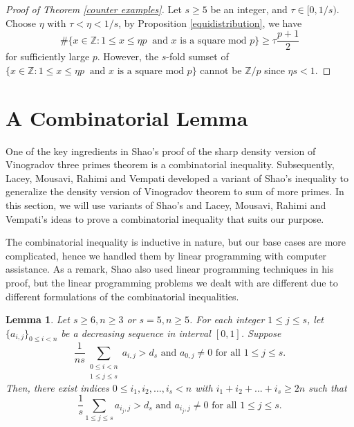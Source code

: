 \documentclass[11pt]{amsart}
\theoremstyle{plain} %
\newtheorem{lem}[thm]{Lemma}
\theoremstyle{remark}
\numberwithin{equation}{section}
\newcommand{\Z}{\mathbb{Z}}
\begin{document}
\begin{proof}[Proof of Theorem \ref{counter examples}]
    Let $s\geq 5$ be an integer, and $\tau\in [0,1/s)$. Choose $\eta$ with $\tau<\eta<1/s$, by Proposition \ref{equidistribution}, we have
    \begin{equation*}
        \#\{x\in\Z:1\leq x\leq \eta p\;\;\text{and $x$ is a square mod $p$}\}\geq\tau\frac{p+1}{2}
    \end{equation*}
    for sufficiently large $p$. However, the $s$-fold sumset of $\{x\in\Z:1\leq x\leq \eta p\;\;\text{and $x$ is a square mod $p$}\}$ cannot be $\Z/p$ since $\eta s<1$.
\end{proof}

\section{A Combinatorial Lemma}\label{sec: combinatorial lemma}

One of the key ingredients in Shao's \cite{Shao} proof of the sharp density version of Vinogradov three primes theorem is a combinatorial inequality. Subsequently, Lacey, Mousavi, Rahimi and Vempati \cite{lacey2024densitytheoremhigherorder} developed a variant of Shao's inequality to generalize the density version of Vinogradov theorem to sum of more primes. In this section, we will use variants of Shao's and Lacey, Mousavi, Rahimi and Vempati's ideas to prove a combinatorial inequality that suits our purpose. 

The combinatorial inequality is inductive in nature, but our base cases are more complicated, hence we handled them by linear programming with computer assistance. As a remark, Shao also used linear programming techniques in his proof, but the linear programming problems we dealt with are different due to different formulations of the combinatorial inequalities.

\begin{lem}\label{combinatorial lemma}
    Let $s\geq 6, n\geq 3$ or $s=5, n\geq 5$. For each integer $1\leq j\leq s$, let $\{a_{i,j}\}_{0\leq i<n}$ be a decreasing sequence in interval $[0,1]$. Suppose 
    \begin{equation*}
        \text{$\frac{1}{ns}\sum_{\substack{0\leq i<n\\1\leq j\leq s}}a_{i,j}>d_s$ and $a_{0,j}\neq 0$ for all $1\leq j\leq s$.}
    \end{equation*}
    Then, there exist indices $0\leq i_1,i_2,...,i_s<n$ with $i_1+i_2+...+i_s\geq 2n$ such that
    \begin{equation*}
        \text{$\frac{1}{s}\sum_{1\leq j\leq s}a_{i_j,j}>d_s$ and $a_{i_j,j}\neq 0$ for all $1\leq j\leq s$.}
    \end{equation*}
\end{lem}
\end{document}
